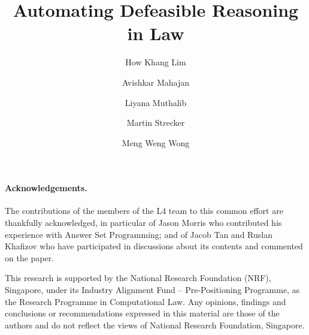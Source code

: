 \documentclass[runningheads]{llncs}
\begin{document}
\title{Automating Defeasible Reasoning in Law}

\author{How Khang Lim\and
  Avishkar Mahajan \and
  Liyana Muthalib \and
  Martin Strecker \and
  Meng Weng Wong
  }
\maketitle

\begin{abstract}

\end{abstract}















\paragraph{Acknowledgements.}
The contributions of the members of the L4 team to this common effort are thankfully acknowledged, in particular of Jason Morris who contributed his experience with Answer Set Programming; and of Jacob Tan and Ruslan Khafizov who have participated in discussions about its contents and commented on the paper.

This research is supported by the National Research Foundation (NRF),
Singapore, under its Industry Alignment Fund – Pre-Positioning Programme, as
the Research Programme in Computational Law. Any opinions, findings and
conclusions or recommendations expressed in this material are those of the
authors and do not reflect the views of National Research Foundation,
Singapore.






\newpage
\appendix




\end{document}
